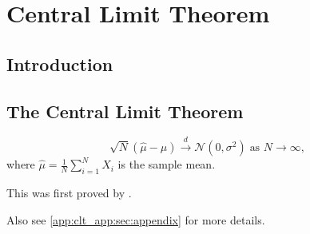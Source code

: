 \chapter{Central Limit Theorem}
\label{chap:clt}



\section{Introduction} \label{clt:sec:introduction}


\section{The Central Limit Theorem}
\label{clt:sec:clt}

\begin{equation}
    \sqrt{N} (\hat{\mu} - \mu) \xrightarrow{d} \mathcal{N} \left( 0, \sigma^2 \right) \; \text{as } N \rightarrow \infty, \label{clt:eq:CLT}
\end{equation}
where $\hat{\mu} = \frac{1}{N}\sum_{i=1}^N X_i$ is the sample mean.

This was first proved by \citet{clt}.

Also see \cref{app:clt_app:sec:appendix} for more details.